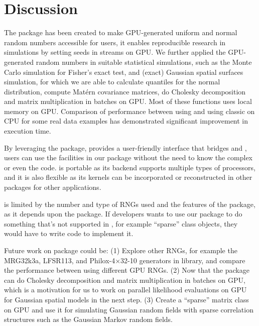 \documentclass[article,nojss]{jss}\usepackage[]{graphicx}\usepackage[]{color}
\begin{document}
\section{Discussion}
The package  has been created to make GPU-generated uniform and normal random numbers accessible for  users, it enables reproducible research in simulations by setting seeds in streams on GPU. We further applied the GPU-generated random numbers in suitable statistical simulations, such as the Monte Carlo simulation for Fisher’s exact test, and (exact) Gaussian spatial surfaces simulation, for which we are able to calculate quantiles for the normal distribution, compute Mat\'ern covariance matrices, do Cholesky decomposition and matrix multiplication in batches on GPU. Most of these functions uses local memory on GPU. Comparison of performance between using  and using classic  on CPU for some real data examples has demonstrated significant improvement in execution time. 

By leveraging the  package,  provides a user-friendly interface that bridges  and , users can use the facilities in our package without the need to know the complex  or even the  code.   is portable as its backend  supports multiple types of processors, and it is also flexible as its kernels can be incorporated or reconstructed in other  packages for other applications. 


 is limited by the number and type of  RNGs used and the features of the  package, as it depends upon the  package. If developers wants to use our package to do something that's not supported in , for example ``sparse'' class objects, they would have to write  code to implement it.

Future work on  package could be: (1) Explore other RNGs, for example the MRG32k3a, LFSR113, and Philox-4×32-10 generators in  library, and compare the  performance between using different GPU RNGs. (2) Now that the package can do Cholesky decomposition and matrix multiplication in batches on GPU, which is a motivation for us to work on parallel likelihood evaluations on GPU for Gaussian spatial models in the next step. (3) Create a ``sparse'' matrix class on GPU and use it for simulating Gaussian random fields with sparse correlation structures such as the Gaussian Markov random fields.
\end{document}
